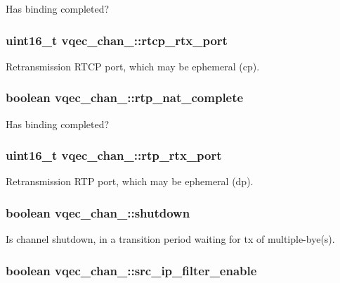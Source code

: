 Has binding completed? 
\subsubsection{\setlength{\rightskip}{0pt plus 5cm}uint16\_\-t \bf{vqec\_\-chan\_\-::rtcp\_\-rtx\_\-port}}\label{structvqec__chan___05cc0ae6a184e69f1d9feb50f86b77ca}


Retransmission RTCP port, which may be ephemeral (cp). 
\subsubsection{\setlength{\rightskip}{0pt plus 5cm}boolean \bf{vqec\_\-chan\_\-::rtp\_\-nat\_\-complete}}\label{structvqec__chan___d5ff04c2b33843315f0150ffbd78ddca}


Has binding completed? 
\subsubsection{\setlength{\rightskip}{0pt plus 5cm}uint16\_\-t \bf{vqec\_\-chan\_\-::rtp\_\-rtx\_\-port}}\label{structvqec__chan___3dd3b0426e09eb63cb41150d7c0332b5}


Retransmission RTP port, which may be ephemeral (dp). 
\subsubsection{\setlength{\rightskip}{0pt plus 5cm}boolean \bf{vqec\_\-chan\_\-::shutdown}}\label{structvqec__chan___9499f91f56d1df1ef1b7e94a31a866c6}


Is channel shutdown, in a transition period waiting for tx of multiple-bye(s). 
\subsubsection{\setlength{\rightskip}{0pt plus 5cm}boolean \bf{vqec\_\-chan\_\-::src\_\-ip\_\-filter\_\-enable}}\label{structvqec__chan___574da7f2da547450e221925cce660fdf}



